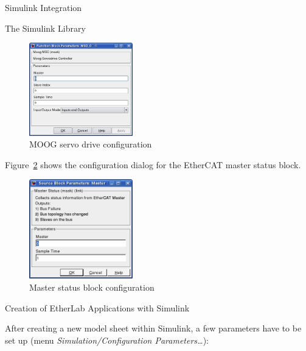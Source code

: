 \begin{ighsec}{Simulink Integration}
\begin{ighsec}{The Simulink Library}
\begin{figure}[H]
  \begin{center}
    \includegraphics[width=0.4\textwidth]{images/moog_msd.png}
    \caption{MOOG servo drive configuration}
    \label{fig:msd}
  \end{center}
\end{figure}

Figure~\ref{fig:masterstats} shows the configuration dialog for the EtherCAT
master status block.

\begin{figure}[H]
  \begin{center}
    \includegraphics[width=0.4\textwidth]{images/master.png}
    \caption{Master status block configuration}
    \label{fig:masterstats}
  \end{center}
\end{figure}

\end{ighsec}


\begin{ighsec}{Creation of EtherLab Applications with Simulink}
\label{sec:simu-apps}

After creating a new model sheet within Simulink, a few parameters have to be
set up (menu \textit{Simulation/Configuration Parameters\ldots}):


\end{ighsec}
\end{ighsec}

